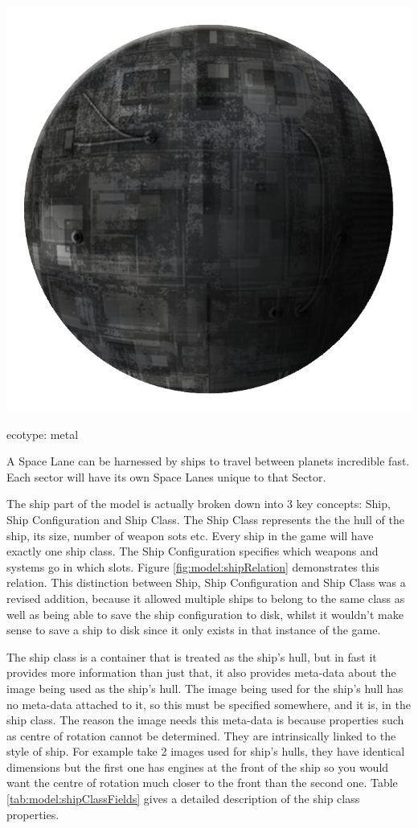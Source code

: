 \begin{marginfigure}
	\includegraphics{res/planets/metal-planet.png}
	\caption{ecotype: metal}
	\label{fig:model:metalPlanet}
\end{marginfigure}


A Space Lane can be harnessed by ships to travel between planets incredible fast.
Each sector will have its own Space Lanes unique to that Sector.


The ship part of the model is actually broken down into 3 key concepts: Ship, Ship Configuration and Ship Class.
The Ship Class represents the the hull of the ship, its size, number of weapon sots etc. Every ship in the game will have exactly one ship class. The Ship Configuration specifies which weapons and systems go in which slots. Figure \ref{fig:model:shipRelation} demonstrates this relation.
This distinction between Ship, Ship Configuration and Ship Class was a revised addition, because it allowed multiple ships to belong to the same class as well as being able to save the ship configuration to disk, whilst it wouldn't make sense to save a ship to disk since it only exists in that instance of the game.

The ship class is a container that is treated as the ship's hull, but in fast it provides more information than just that, it also provides meta-data about the image being used as the ship's hull.
The image being used for the ship's hull has no meta-data attached to it, so this must be specified somewhere, and it is, in the ship class.
The reason the image needs this meta-data is because properties such as centre of rotation cannot be determined. 
They are intrinsically linked to the style of ship. 
For example take 2 images used for ship's hulls, they have identical dimensions but the first one has engines at the front of the ship so you would want the centre of rotation much closer to the front than the second one. 
Table \ref{tab:model:shipClassFields} gives a detailed description of the ship class properties.

